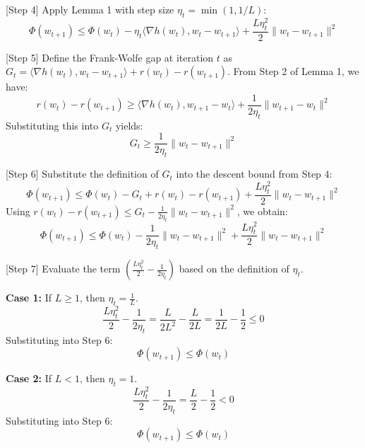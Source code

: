 \documentclass{article}
\begin{document}
[Step 4] Apply Lemma 1 with step size $\eta_t = \min(1, 1/L)$:
\begin{equation}
    \Phi(w_{t+1}) \leq \Phi(w_t) - \eta_t \langle \nabla h(w_t), w_t - w_{t+1} \rangle + \frac{L\eta_t^2}{2}\|w_t - w_{t+1}\|^2
\end{equation}

[Step 5] Define the Frank-Wolfe gap at iteration $t$ as $G_t = \langle \nabla h(w_t), w_t - w_{t+1} \rangle + r(w_t) - r(w_{t+1})$. From Step 2 of Lemma 1, we have:
\begin{equation}
    r(w_t) - r(w_{t+1}) \geq \langle \nabla h(w_t), w_{t+1} - w_t \rangle + \frac{1}{2\eta_t} \|w_{t+1} - w_t\|^2
\end{equation}
Substituting this into $G_t$ yields:
\begin{equation}
    G_t \geq \frac{1}{2\eta_t} \|w_t - w_{t+1}\|^2
\end{equation}

[Step 6] Substitute the definition of $G_t$ into the descent bound from Step 4:
\begin{equation}
    \Phi(w_{t+1}) \leq \Phi(w_t) - G_t + r(w_t) - r(w_{t+1}) + \frac{L\eta_t^2}{2}\|w_t - w_{t+1}\|^2
\end{equation}
Using $r(w_t) - r(w_{t+1}) \leq G_t - \frac{1}{2\eta_t} \|w_t - w_{t+1}\|^2$, we obtain:
\begin{equation}
    \Phi(w_{t+1}) \leq \Phi(w_t) - \frac{1}{2\eta_t} \|w_t - w_{t+1}\|^2 + \frac{L\eta_t^2}{2}\|w_t - w_{t+1}\|^2
\end{equation}

[Step 7] Evaluate the term $\left(\frac{L\eta_t^2}{2} - \frac{1}{2\eta_t}\right)$ based on the definition of $\eta_t$.

\textbf{Case 1:} If $L \geq 1$, then $\eta_t = \frac{1}{L}$.
\begin{equation}
    \frac{L\eta_t^2}{2} - \frac{1}{2\eta_t} = \frac{L}{2L^2} - \frac{L}{2L} = \frac{1}{2L} - \frac{1}{2} \leq 0
\end{equation}
Substituting into Step 6:
\begin{equation}
    \Phi(w_{t+1}) \leq \Phi(w_t)
\end{equation}

\textbf{Case 2:} If $L < 1$, then $\eta_t = 1$.
\begin{equation}
    \frac{L\eta_t^2}{2} - \frac{1}{2\eta_t} = \frac{L}{2} - \frac{1}{2} < 0
\end{equation}
Substituting into Step 6:
\begin{equation}
    \Phi(w_{t+1}) \leq \Phi(w_t)
\end{equation}
\end{document}
